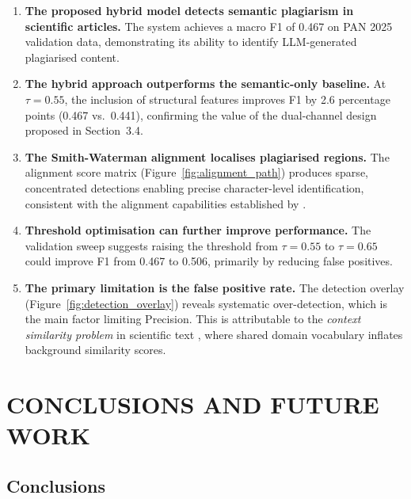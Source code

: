 \documentclass[12pt, a4paper]{article}
\begin{document}
\begin{enumerate}
	\item \textbf{The proposed hybrid model detects semantic plagiarism in scientific articles.} The system achieves a macro F1 of 0.467 on PAN 2025 validation data, demonstrating its ability to identify LLM-generated plagiarised content.

	\item \textbf{The hybrid approach outperforms the semantic-only baseline.} At $\tau = 0.55$, the inclusion of structural features improves F1 by 2.6 percentage points (0.467 vs.\ 0.441), confirming the value of the dual-channel design proposed in Section~3.4.

	\item \textbf{The Smith-Waterman alignment localises plagiarised regions.} The alignment score matrix (Figure~\ref{fig:alignment_path}) produces sparse, concentrated detections enabling precise character-level identification, consistent with the alignment capabilities established by \citet{Antonius2023}.

	\item \textbf{Threshold optimisation can further improve performance.} The validation sweep suggests raising the threshold from $\tau = 0.55$ to $\tau = 0.65$ could improve F1 from 0.467 to 0.506, primarily by reducing false positives.

	\item \textbf{The primary limitation is the false positive rate.} The detection overlay (Figure~\ref{fig:detection_overlay}) reveals systematic over-detection, which is the main factor limiting Precision. This is attributable to the \textit{context similarity problem} in scientific text \citep{Lieharyani2025}, where shared domain vocabulary inflates background similarity scores.
\end{enumerate}

\newpage
\section{CONCLUSIONS AND FUTURE WORK}

\subsection{Conclusions}
\end{document}
